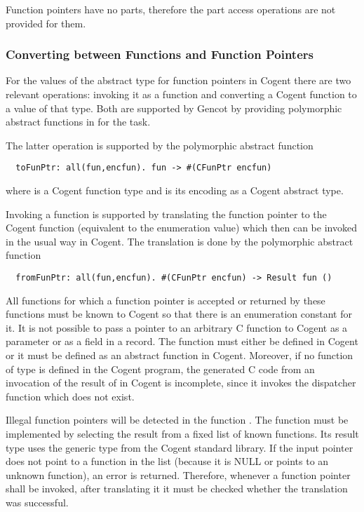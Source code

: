 Function pointers have no parts, therefore the part access operations are not provided for them.

\subsubsection{Converting between Functions and Function Pointers}

For the values of the abstract type for function pointers in Cogent there are two relevant operations: invoking
it as a function and converting a Cogent function to a value of that type. Both are supported by Gencot
by providing polymorphic abstract functions in  for the task.

The latter operation is supported by the polymorphic abstract function
\begin{verbatim}
  toFunPtr: all(fun,encfun). fun -> #(CFunPtr encfun)
\end{verbatim}
where  is a Cogent function type and  is its encoding as a Cogent abstract type.

Invoking a function is supported by translating the function pointer to the Cogent function (equivalent to the enumeration value) which
then can be invoked in the usual way in Cogent. The translation is done by the polymorphic abstract function
\begin{verbatim}
  fromFunPtr: all(fun,encfun). #(CFunPtr encfun) -> Result fun ()
\end{verbatim}

All functions for which a function pointer is accepted or returned by these functions must be known to
Cogent so that there is an enumeration constant for it. It is not possible to pass a pointer to an arbitrary 
C function to Cogent as a parameter or as a field in a record. The function must either be defined in Cogent 
or it must be defined as an abstract function in Cogent. Moreover, if no function of type  is 
defined in the Cogent program, the generated C code from an invocation of the result of  
in Cogent is incomplete, since it invokes the dispatcher function which does not exist.

Illegal function pointers will be detected in the function . The function must be implemented 
by selecting the result from a fixed list of known functions. Its result type uses the generic type 
from the Cogent standard library. If the input pointer does not point to a 
function in the list (because it is NULL or points to an unknown function), an error is returned. Therefore,
whenever a function pointer shall be invoked, after translating it it must be checked whether the translation
was successful.

